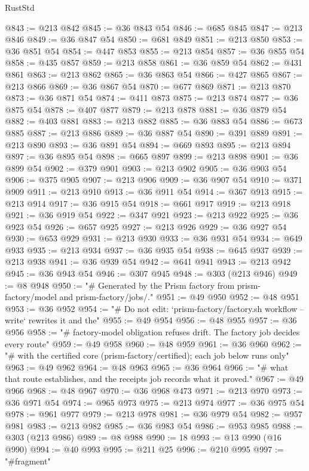 \begin{lexlean}{RustStd}
\begin{coremodule}
@843 := @213 @842
@845 := @36 @843 @54
@846 := @685 @845
@847 := @213 @846
@849 := @36 @847 @54
@850 := @681 @849
@851 := @213 @850
@853 := @36 @851 @54
@854 := @447 @853
@855 := @213 @854
@857 := @36 @855 @54
@858 := @435 @857
@859 := @213 @858
@861 := @36 @859 @54
@862 := @431 @861
@863 := @213 @862
@865 := @36 @863 @54
@866 := @427 @865
@867 := @213 @866
@869 := @36 @867 @54
@870 := @677 @869
@871 := @213 @870
@873 := @36 @871 @54
@874 := @411 @873
@875 := @213 @874
@877 := @36 @875 @54
@878 := @407 @877
@879 := @213 @878
@881 := @36 @879 @54
@882 := @403 @881
@883 := @213 @882
@885 := @36 @883 @54
@886 := @673 @885
@887 := @213 @886
@889 := @36 @887 @54
@890 := @391 @889
@891 := @213 @890
@893 := @36 @891 @54
@894 := @669 @893
@895 := @213 @894
@897 := @36 @895 @54
@898 := @665 @897
@899 := @213 @898
@901 := @36 @899 @54
@902 := @379 @901
@903 := @213 @902
@905 := @36 @903 @54
@906 := @375 @905
@907 := @213 @906
@909 := @36 @907 @54
@910 := @371 @909
@911 := @213 @910
@913 := @36 @911 @54
@914 := @367 @913
@915 := @213 @914
@917 := @36 @915 @54
@918 := @661 @917
@919 := @213 @918
@921 := @36 @919 @54
@922 := @347 @921
@923 := @213 @922
@925 := @36 @923 @54
@926 := @657 @925
@927 := @213 @926
@929 := @36 @927 @54
@930 := @653 @929
@931 := @213 @930
@933 := @36 @931 @54
@934 := @649 @933
@935 := @213 @934
@937 := @36 @935 @54
@938 := @645 @937
@939 := @213 @938
@941 := @36 @939 @54
@942 := @641 @941
@943 := @213 @942
@945 := @36 @943 @54
@946 := @307 @945
@948 := @303 (@213 @946)
@949 := @8 @948
@950 := "# Generated by the Prism factory from prism-factory/model and prism-factory/jobs/."
@951 := @49 @950
@952 := @48 @951
@953 := @36 @952
@954 := "# Do not edit: `prism-factory/factory.sh workflow --write` rewrites it and the"
@955 := @49 @954
@956 := @48 @955
@957 := @36 @956
@958 := "# factory-model obligation refuses drift. The factory job decides every route"
@959 := @49 @958
@960 := @48 @959
@961 := @36 @960
@962 := "# with the certified core (prism-factory/certified); each job below runs only"
@963 := @49 @962
@964 := @48 @963
@965 := @36 @964
@966 := "# what that route establishes, and the receipts job records what it proved."
@967 := @49 @966
@968 := @48 @967
@970 := @36 @968 @473
@971 := @213 @970
@973 := @36 @971 @54
@974 := @965 @973
@975 := @213 @974
@977 := @36 @975 @54
@978 := @961 @977
@979 := @213 @978
@981 := @36 @979 @54
@982 := @957 @981
@983 := @213 @982
@985 := @36 @983 @54
@986 := @953 @985
@988 := @303 (@213 @986)
@989 := @8 @988
@990 := 18
@993 := @13 @990 (@16 @990)
@994 := @40 @993
@995 := @211 @25
@996 := @210 @995
@997 := "#fragment"

\end{coremodule}
\end{lexlean}
